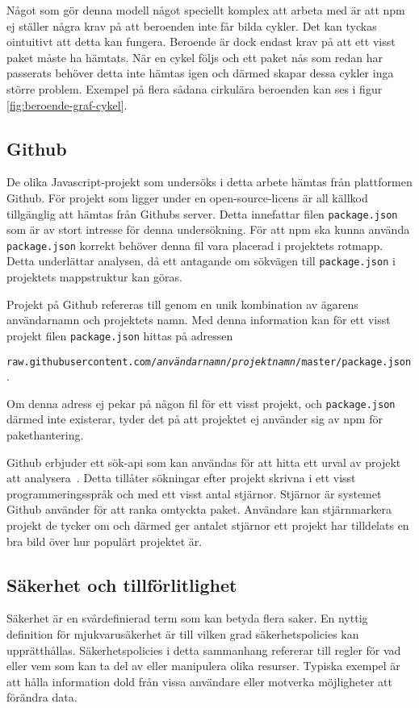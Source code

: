 Något som gör denna modell något speciellt komplex att arbeta med är att npm ej ställer några krav på att beroenden inte får bilda cykler. Det kan tyckas ointuitivt att detta kan fungera. Beroende är dock endast krav på att ett visst paket måste ha hämtats. När en cykel följs och ett paket nås som redan har passerats behöver detta inte hämtas igen och därmed skapar dessa cykler inga större problem. Exempel på flera sådana cirkulära beroenden kan ses i figur \ref{fig:beroende-graf-cykel}.

\subsection{Github}
De olika Javascript-projekt som undersöks i detta arbete hämtas från plattformen Github. För projekt som ligger under en open-source-licens är all källkod tillgänglig att hämtas från Githubs server. Detta innefattar filen \texttt{package.json} som är av stort intresse för denna undersökning. För att npm ska kunna använda \texttt{package.json} korrekt behöver denna fil vara placerad i projektets rotmapp. Detta underlättar analysen, då ett antagande om sökvägen till \texttt{package.json} i projektets mappstruktur kan göras.

Projekt på Github refereras till genom en unik kombination av ägarens användarnamn och projektets namn. Med denna information kan för ett visst projekt filen \texttt{package.json} hittas på adressen

\texttt{raw.githubusercontent.com/\textit{användarnamn}/\textit{projektnamn}/master/package.json}.

Om denna adress ej pekar på någon fil för ett visst projekt, och \texttt{package.json} därmed inte existerar, tyder det på att projektet ej använder sig av npm för pakethantering.

Github erbjuder ett sök-api som kan användas för att hitta ett urval av projekt att analysera~\cite{github-api}. Detta tillåter sökningar efter projekt skrivna i ett visst programmeringsspråk och med ett visst antal stjärnor. Stjärnor är systemet Github använder för att ranka omtyckta paket. Användare kan stjärnmarkera projekt de tycker om och därmed ger antalet stjärnor ett projekt har tilldelats en bra bild över hur populärt projektet är.

\subsection{Säkerhet och tillförlitlighet}
Säkerhet är en svårdefinierad term som kan betyda flera saker. En nyttig definition för mjukvarusäkerhet är till vilken grad säkerhetspolicies kan upprätthållas. Säkerhetspolicies i detta sammanhang refererar till regler för vad eller vem som kan ta del av eller manipulera olika resurser. Typiska exempel är att hålla information dold från vissa användare eller motverka möjligheter att förändra data. \cite{secure-software}

